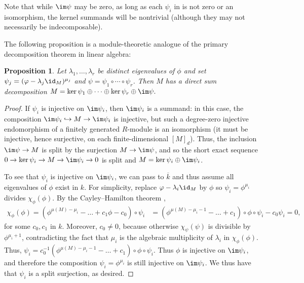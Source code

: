 \documentclass[12pt]{amsart}
\theoremstyle{theorem}
\numberwithin{thm}{section}
\newtheorem{prop}[thm]{Proposition}
\theoremstyle{definition}
\begin{document}
Note that while $\im\psi$ may be zero, as long as each $\psi_i$ in  is not zero or an isomorphism, the kernel summands will be nontrivial (although they may not necessarily be indecomposable).

The following proposition is a module-theoretic analogue of the primary decomposition theorem in linear algebra:

\begin{prop}\label{prop:split-surj}
  Let $\lambda_1,\dots,\lambda_r$ be distinct eigenvalues of $\phi$ and set $\psi_j = (\phi - \lambda_j\id_M)^{\mu_j}$ and $\psi = \psi_1\circ\cdots\circ\psi_r$. Then $M$ has a direct sum decomposition
  \( M = \ker\psi_1 \oplus \cdots \oplus \ker\psi_r \oplus \im\psi. \)
\end{prop}


\begin{proof}
  If $\psi_i$ is injective on $\im\psi_i$, then $\im\psi_i$ is a summand: in this case, the composition $\im\psi_i\hookrightarrow M\to \im\psi_i$ is injective, but such a degree-zero injective endomorphism of a finitely generated $R$-module is an isomorphism (it must be injective, hence surjective, on each finite-dimensional $[M]_d$). Thus, the inclusion $\im \psi \to M$ is split by the surjection $M\to \im \psi$, and so the short exact sequence $0\to\ker\psi_i\to M\to\im\psi_i\to 0$ is split and $M = \ker\psi_i\oplus\im\psi_i$.

  To see that $\psi_i$ is injective on $\im\psi_i$, we can pass to $\overline k$ and thus assume all eigenvalues of $\phi$ exist in $k$. For simplicity, replace $\phi-\lambda_i\id_M$ by $\phi$ so $\psi_i = \phi^{\mu_i} $ divides $ \chi_\phi(\phi)$.
By the Cayley--Hamilton theorem \cite[Theorem~4.3]{Eisenbud95},
  \begin{align*}
    \chi_\phi(\phi) = \left(\phi^{\mu(M) - \mu_i} - \dots + c_1\phi - c_0\right) \circ \psi_i
    &= \left(\phi^{\mu(M) - \mu_i - 1} - \dots + c_1\right) \circ \phi \circ \psi_i - c_0 \psi_i = 0,
  \end{align*}
  for some $c_0,c_1$ in $k$. Moreover, $c_0\neq 0$, because otherwise $\chi_\psi(\psi)$ is divisible by $\phi^{\mu_i+1}$, contradicting the fact that $\mu_i$ is the algebraic multiplicity of $\lambda_i$ in $\chi_\phi(\phi)$.
Thus,
  \( \psi_i = c_0^{-1} \left(\phi^{\mu(M) - \mu_i - 1} - \dots + c_1\right) \circ \phi \circ \psi_i. \)
  Thus $\phi$ is injective on $\im\psi_i$, and therefore the composition $\psi_i=\phi^{\mu_i}$ is still injective on $\im\psi_i$.
We thus have that $\psi_i$ is a split surjection, as desired.


\end{proof}
\end{document}
